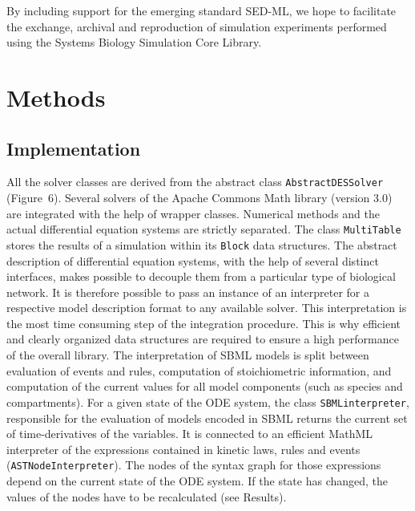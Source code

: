 \documentclass[10pt]{bmc_article}
\newenvironment{bmcformat}{\baselineskip20pt\sloppy\setboolean{publ}{false}}{\baselineskip20pt\sloppy}
\newcommand{\AbstractDESSolver}{\texttt{Abstract\-DES\-Solver}}
\newcommand{\SBMLinterpreter}{\texttt{SBML\-interpreter}}
\newcommand{\MultiTable}{\texttt{Multi\-Table}}
\newcommand{\Block}{\texttt{Block}}
\newcommand{\ASTNodeInterpreter}{\texttt{ASTNode\-In\-terpreter}}
\begin{document}
\begin{bmcformat}

By including support for the emerging standard SED-ML, we hope to facilitate the
exchange, archival and reproduction of simulation experiments performed using
the Systems Biology Simulation Core Library.

\section*{Methods}

\subsection*{Implementation}

All the solver classes are derived from the abstract class \AbstractDESSolver{}
(Figure~6).
Several solvers of the Apache Commons Math library (version 3.0) are integrated
with the help of wrapper classes. Numerical methods and the actual differential
equation systems are strictly separated. The class \MultiTable{} stores the
results of a simulation within its \Block{} data structures. 
%
The abstract description of differential equation systems, with the help of
several distinct interfaces, makes possible to decouple them from a particular
type of biological network. It is therefore possible to pass an instance of an
interpreter for a respective model description format to any available solver.
%
This interpretation is the most time consuming step of the integration procedure.
This is why efficient and clearly organized data structures are required to
ensure a high performance of the overall library. The interpretation of SBML
models is split between evaluation of events and rules, computation of
stoichiometric information, and computation of the current values for all model
components (such as species and compartments).
%
For a given state of the ODE system, the class \SBMLinterpreter{}, responsible
for the evaluation of models encoded in SBML returns the current set of
time-derivatives of the variables.
It is connected to an efficient MathML interpreter of the expressions contained
in kinetic laws, rules and events (\ASTNodeInterpreter{}). The nodes of the syntax graph for those
expressions depend on the current state of the ODE system. If the state has
changed, the values of the nodes have to be recalculated (see Results).


\end{bmcformat}
\end{document}

